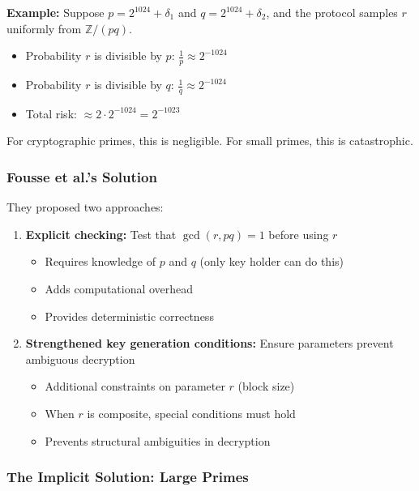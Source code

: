 \documentclass[11pt]{article}
\theoremstyle{definition}
\begin{document}
\textbf{Example:}
Suppose $p = 2^{1024} + \delta_1$ and $q = 2^{1024} + \delta_2$, and the protocol samples $r$ uniformly from $\mathbb{Z}/(pq)$.

\begin{itemize}
\item Probability $r$ is divisible by $p$: $\frac{1}{p} \approx 2^{-1024}$
\item Probability $r$ is divisible by $q$: $\frac{1}{q} \approx 2^{-1024}$
\item Total risk: $\approx 2 \cdot 2^{-1024} = 2^{-1023}$
\end{itemize}

For cryptographic primes, this is negligible. For small primes, this is catastrophic.

\subsubsection{Fousse et al.'s Solution}

They proposed two approaches:

\begin{enumerate}
\item \textbf{Explicit checking:} Test that $\gcd(r, pq) = 1$ before using $r$
  \begin{itemize}
  \item Requires knowledge of $p$ and $q$ (only key holder can do this)
  \item Adds computational overhead
  \item Provides deterministic correctness
  \end{itemize}

\item \textbf{Strengthened key generation conditions:} Ensure parameters prevent ambiguous decryption
  \begin{itemize}
  \item Additional constraints on parameter $r$ (block size)
  \item When $r$ is composite, special conditions must hold
  \item Prevents structural ambiguities in decryption
  \end{itemize}
\end{enumerate}

\subsubsection{The Implicit Solution: Large Primes}
\end{document}
